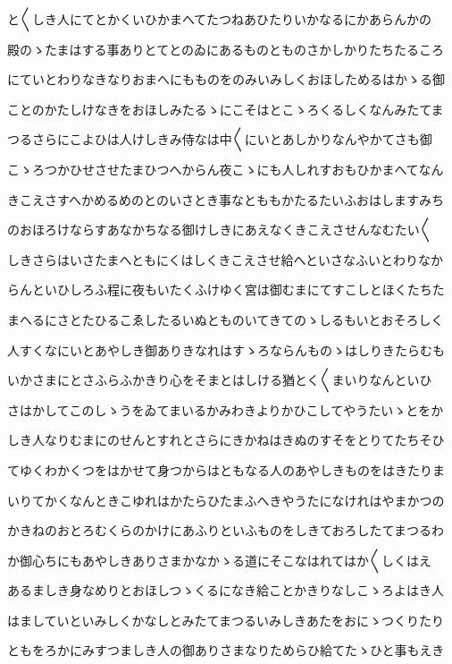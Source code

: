 \documentclass[a4paper,11pt,landscape]{ltjtarticle}
\begin{document}
と〱しき人にてとかくいひかまへてたつねあひたりいかなるにかあらんかの
\par\medskip
殿のゝたまはする事ありとてとのゐにあるものとものさかしかりたちたるころ
\par\medskip
にていとわりなきなりおまへにもものをのみいみしくおほしためるはかゝる御
\par\medskip
ことのかたしけなきをおほしみたるゝにこそはとこゝろくるしくなんみたてま
\par\medskip
つるさらにこよひは人けしきみ侍なは中〱にいとあしかりなんやかてさも御
\par\medskip
こゝろつかひせさせたまひつへからん夜こゝにも人しれすおもひかまへてなん
\par\medskip
きこえさすへかめるめのとのいさとき事なとももかたるたいふおはしますみち
\par\medskip
のおほろけならすあなかちなる御けしきにあえなくきこえさせんなむたい〱
\par\medskip
しきさらはいさたまへともにくはしくきこえさせ給へといさなふいとわりなか
\par\medskip
らんといひしろふ程に夜もいたくふけゆく宮は御むまにてすこしとほくたちた
\par\medskip
まへるにさとたひるこゑしたるいぬとものいてきてのゝしるもいとおそろしく
\par\medskip
人すくなにいとあやしき御ありきなれはすゝろならんものゝはしりきたらむも
\par\medskip
いかさまにとさふらふかきり心をそまとはしける猶とく〱まいりなんといひ
\par\medskip
さはかしてこのしゝうをゐてまいるかみわきよりかひこしてやうたいゝとをか
\par\medskip
しき人なりむまにのせんとすれとさらにきかねはきぬのすそをとりてたちそひ
\par\medskip
てゆくわかくつをはかせて身つからはともなる人のあやしきものをはきたりま
\par\medskip
いりてかくなんときこゆれはかたらひたまふへきやうたになけれはやまかつの
\par\medskip
かきねのおとろむくらのかけにあふりといふものをしきておろしたてまつるわ
\par\medskip
か御心ちにもあやしきありさまかなかゝる道にそこなはれてはか〱しくはえ
\par\medskip
あるましき身なめりとおほしつゝくるになき給ことかきりなしこゝろよはき人
\par\medskip
はましていといみしくかなしとみたてまつるいみしきあたをおにゝつくりたり
\par\medskip
ともをろかにみすつましき人の御ありさまなりためらひ給てたゝひと事もえき
\end{document}
